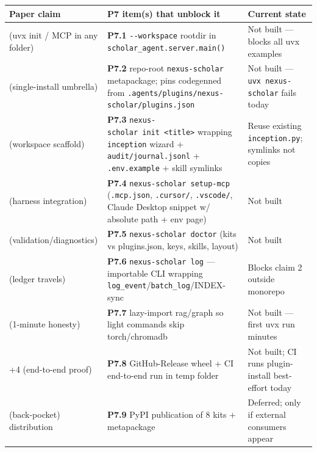 \documentclass[11pt]{article}
\newcounter{none} %
\begin{document}
{\def\LTcaptype{none} %
\begin{longtable}[]{@{}
  >{\raggedright\arraybackslash}p{}
  >{\raggedright\arraybackslash}p{}
  >{\raggedright\arraybackslash}p{}@{}}
\toprule\noalign{}
\begin{minipage}[b]{\linewidth}\raggedright
Paper claim
\end{minipage} & \begin{minipage}[b]{\linewidth}\raggedright
P7 item(s) that unblock it
\end{minipage} & \begin{minipage}[b]{\linewidth}\raggedright
Current state
\end{minipage} \\
\midrule\noalign{}
\endhead
\bottomrule\noalign{}
\endlastfoot
4 (uvx init / MCP in any folder) & \textbf{P7.1} \texttt{-\/-workspace}
rootdir in \texttt{scholar\_agent.server.main()} & Not built --- blocks
all uvx examples \\
4 (single-install umbrella) & \textbf{P7.2} repo-root
\texttt{nexus-scholar} metapackage; pins codegenned from
\texttt{.agents/plugins/nexus-scholar/plugins.json} & Not built ---
\texttt{uvx\ nexus-scholar} fails today \\
4 (workspace scaffold) & \textbf{P7.3}
\texttt{nexus-scholar\ init\ \textless{}title\textgreater{}} wrapping
\texttt{inception} wizard + \texttt{audit/journal.jsonl} +
\texttt{.env.example} + skill symlinks & Reuse existing
\texttt{inception.py}; symlinks not copies \\
4 (harness integration) & \textbf{P7.4}
\texttt{nexus-scholar\ setup-mcp} (\texttt{.mcp.json},
\texttt{.cursor/}, \texttt{.vscode/}, Claude Desktop snippet w/ absolute
path + env page) & Not built \\
4 (validation/diagnostics) & \textbf{P7.5}
\texttt{nexus-scholar\ doctor} (kits vs plugins.json, keys, skills,
layout) & Not built \\
2 (ledger travels) & \textbf{P7.6} \texttt{nexus-scholar\ log} ---
importable CLI wrapping
\texttt{log\_event}/\texttt{batch\_log}/INDEX-sync & Blocks claim 2
outside monorepo \\
4 (1-minute honesty) & \textbf{P7.7} lazy-import rag/graph so light
commands skip torch/chromadb & Not built --- first uvx run minutes \\
1+4 (end-to-end proof) & \textbf{P7.8} GitHub-Release wheel + CI
end-to-end run in temp folder & Not built; CI runs plugin-install
best-effort today \\
(back-pocket) distribution & \textbf{P7.9} PyPI publication of 8 kits +
metapackage & Deferred; only if external consumers appear \\
\end{longtable}
}
\end{document}
